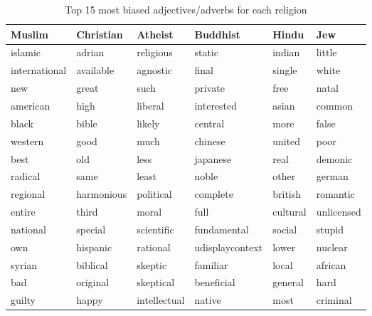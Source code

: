 \documentclass[11pt,a4paper]{article}
\begin{document}
\begin{appendices}
\begin{table*}[htb]
\centering
\begin{tiny}
\begin{tabular}{|p{}|p{}|p{}|p{}|p{}|p{}|}
\hline
Muslim & Christian & Atheist & Buddhist & Hindu & Jew \\ \hline
islamic & adrian & religious & static & indian & little
\\
international & available & agnostic & final & single & white
\\
new & great & such & private & free & natal
\\
american & high & liberal & interested & asian & common
\\
black & bible & likely & central & more & false
\\
western & good & much & chinese & united & poor
\\
best & old & less & japanese & real & demonic
\\
radical & same & least & noble & other & german
\\
regional & harmonious & political & complete & british & romantic
\\
entire & third & moral & full & cultural & unlicensed
\\
national & special & scientific & fundamental & social & stupid
\\
own & hispanic & rational & udisplaycontext & lower & nuclear
\\
syrian & biblical & skeptic & familiar & local & african
\\
bad & original & skeptical & beneficial & general & hard
\\
guilty & happy & intellectual & native & most & criminal
\\
\hline
\end{tabular}
\end{tiny}
\caption{Top 15 most biased adjectives/adverbs for each religion}
\label{table:religion_cooccurrence}
\end{table*}


\end{appendices}
\end{document}
